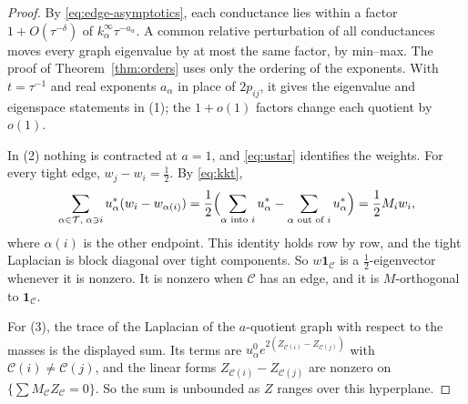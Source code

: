 \begin{proof}
By \eqref{eq:edge-asymptotics}, each conductance lies within a factor
$1+O(\tau^{-\delta})$ of $k^\infty_\alpha\tau^{-a_\alpha}$. A common relative
perturbation of all conductances moves every graph eigenvalue by at most the same
factor, by min--max. The proof of Theorem~\ref{thm:orders} uses only the
ordering of the exponents. With $t=\tau^{-1}$ and real exponents
$a_\alpha$ in place of $2p_{ij}$, it gives the eigenvalue and eigenspace
statements in (1); the $1+o(1)$ factors change each quotient by $o(1)$.

In (2) nothing is contracted at $a=1$, and \eqref{eq:ustar} identifies the
weights. For every tight edge, $w_j-w_i=\frac12$. By \eqref{eq:kkt},
\[
 \sum_{\alpha\in\mathcal T,\;\alpha\ni i}u^*_\alpha(w_i-w_{\alpha(i)})
 =\frac12\Bigl(\sum_{\alpha\text{ into }i}u^*_\alpha
 -\sum_{\alpha\text{ out of }i}u^*_\alpha\Bigr)=\frac12M_iw_i,
\]
where $\alpha(i)$ is the other endpoint. This identity holds row by row, and
the tight Laplacian is block diagonal over tight components. So
$w\mathbf 1_{\mathcal C}$ is a $\frac12$-eigenvector whenever it is nonzero. It is
nonzero when $\mathcal C$ has an edge, and it is $M$-orthogonal to $\mathbf 1_{\mathcal C}$.

For (3), the trace of the Laplacian of the $a$-quotient graph with respect to the
masses is the displayed sum. Its terms are
$u^0_\alpha e^{2(Z_{\mathcal C(i)}-Z_{\mathcal C(j)})}$ with $\mathcal C(i)\ne \mathcal C(j)$, and the linear
forms $Z_{\mathcal C(i)}-Z_{\mathcal C(j)}$ are nonzero on $\{\sum M_{\mathcal C}Z_{\mathcal C}=0\}$. So the sum is
unbounded as $Z$ ranges over this hyperplane.


\end{proof}
